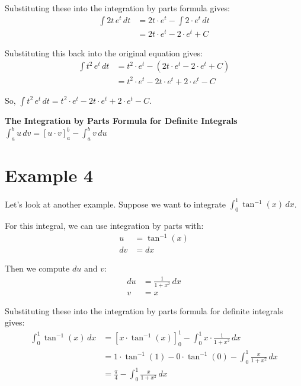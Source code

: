 \documentclass{article}
\begin{document}
Substituting these into the integration by parts formula gives:
\begin{align*}
    \int 2t \, e^t \, dt &= 2t \cdot e^t - \int 2 \cdot e^t \, dt \\
    &= 2t \cdot e^t - 2 \cdot e^t + C
\end{align*}

Substituting this back into the original equation gives:
\begin{align*}
    \int t^2 \, e^t \, dt &= t^2 \cdot e^t - (2t \cdot e^t - 2 \cdot e^t + C) \\
    &= t^2 \cdot e^t - 2t \cdot e^t + 2 \cdot e^t - C
\end{align*}

So, $\int t^2 \, e^t \, dt = t^2 \cdot e^t - 2t \cdot e^t + 2 \cdot e^t - C$.

\begin{tcolorbox}[colback=red!5!white,colframe=red!75!black]
  \begin{center}
    \textbf{The Integration by Parts Formula for Definite Integrals} \\
    $\int_a^b u \, dv = [u \cdot v]_a^b - \int_a^b v \, du$
  \end{center}
\end{tcolorbox}

\section{Example 4}

Let's look at another example. Suppose we want to integrate $\int_0^1 \tan^{-1}(x) \, dx$.

For this integral, we can use integration by parts with:
\begin{align*}
    u &= \tan^{-1}(x) \\
    dv &= dx
\end{align*}

Then we compute $du$ and $v$:
\begin{align*}
    du &= \frac{1}{1+x^2} \, dx \\
    v &= x
\end{align*}

Substituting these into the integration by parts formula for definite integrals gives:
\begin{align*}
    \int_0^1 \tan^{-1}(x) \, dx &= [x \cdot \tan^{-1}(x)]_0^1 - \int_0^1 x \cdot \frac{1}{1+x^2} \, dx \\
    &= 1 \cdot \tan^{-1}(1) - 0 \cdot \tan^{-1}(0) - \int_0^1 \frac{x}{1+x^2} \, dx \\
    &= \frac{\pi}{4} - \int_0^1 \frac{x}{1+x^2} \, dx
\end{align*}
\end{document}
